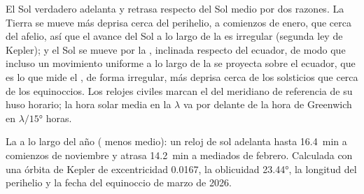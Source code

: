 El Sol verdadero adelanta y retrasa respecto del Sol medio por dos razones. La
Tierra se mueve más deprisa cerca del perihelio, a comienzos de enero, que cerca
del afelio, así que el avance del Sol a lo largo de la  es irregular
(segunda ley de Kepler); y el Sol se mueve por la , inclinada respecto
del ecuador, de modo que incluso un movimiento uniforme a lo largo de la 
se proyecta sobre el ecuador, que es lo que mide el , de forma
irregular, más deprisa cerca de los solsticios que cerca de los equinoccios. Los
relojes civiles marcan el  del meridiano de referencia de su
huso horario; la hora solar media en la  $\lambda$ va por delante de la
hora de Greenwich en $\lambda/\ang{15}$ horas.

\begin{omfigure}

{\small La  a lo largo del año ( menos
medio): un reloj de sol adelanta hasta \qty{16.4}{min} a comienzos de noviembre y
atrasa \qty{14.2}{min} a mediados de febrero. Calculada con una órbita de Kepler de
excentricidad 0.0167, la oblicuidad \ang{23.44}, la longitud del perihelio y la
fecha del equinoccio de marzo de 2026.}
\end{omfigure}

